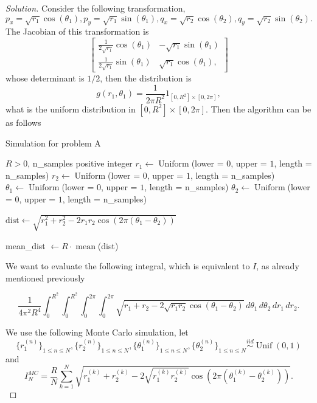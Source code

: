 \documentclass[a4paper,10pt, notitlepage]{report}
\begin{document}
\begin{enumerate}
\begin{proof}[Solution]

 Consider the following transformation, 
 $$
 p_x = \sqrt{r_1}\cos(\theta_1), p_y = \sqrt{r_1}\sin(\theta_1), q_x = \sqrt{r_2}\cos(\theta_2), q_y = \sqrt{r_2}\sin(\theta_2).
 $$
 The Jacobian of this transformation is 
 $$
 \begin{bmatrix}
    \frac{1}{2\sqrt{r_1}}\cos(\theta_1) & -\sqrt{r_1}\sin(\theta_1) \\
    \frac{1}{2\sqrt{r_1}}\sin(\theta_1) & \sqrt{r_1}\cos(\theta_1),
\end{bmatrix}
 $$
 whose determinant is $1/2$, then the distribution is 
 $$
 g(r_1, \theta_1) = \frac{1}{2\pi R^2}1_{[0,R^2] \times [0,2\pi]}, 
 $$
 what is the uniform distribution in $[0,R^2] \times [0,2\pi]$. Then the
 algorithm can be as follows

 \begin{algorithm}
    \caption{Simulation for problem A}\label{alg:problem-A}
    \begin{algorithmic}
    \Require $R > 0$, n\_samples positive integer
    \State $r_1 \gets \operatorname{Uniform}$(lower = 0, upper = $1$, length = n\_samples)
    \State $r_2 \gets \operatorname{Uniform}$(lower = 0, upper = $1$, length = n\_samples)
    \State $\theta_1 \gets \operatorname{Uniform}$(lower = 0, upper = $1$,
    length = n\_samples)
    \State $\theta_2 \gets \operatorname{Uniform}$(lower = 0, upper = $1$,
    length = n\_samples)
    
    \State $\text{dist} \gets \sqrt{r_1^2 + r_2^2 - 2r_1r_2\cos(2\pi(\theta_1 -
    \theta_2))}$ 

    \State mean\_dist $\gets R\cdot \operatorname{mean}$(dist)

    \end{algorithmic}
\end{algorithm}

We want to evaluate the following integral, which is equivalent to $I$, as
already mentioned previously

$$
\frac{1}{4\pi^2 R^4}\int_{0}^{R^2}\int_{0}^{R^2}\int_{0}^{2\pi}\int_{0}^{2\pi}\sqrt{r_1 + r_2 - 2\sqrt{r_1r_2}\cos(\theta_1 -\theta_2)}\,d\theta_1\,d\theta_2\,dr_1\,dr_2.
$$

We use the following Monte Carlo simulation, let 
$$
\{r_1^{(n)}\}_{1 \le n \le N}, \{r_2^{(n)}\}_{1 \le n \le N}
, \{\theta_1^{(n)}\}_{1 \le n \le N}
, \{\theta_2^{(n)}\}_{1 \le n \le N} \overset{iid}{\sim} \operatorname{Unif}(0,1)
$$
and 
$$
I^{MC}_N = \frac{R}{N}\sum_{k=1}^N \sqrt{r_1^{(k)} + r_2^{(k)} - 2\sqrt{r_1^{(k)}r_2^{(k)}} \cos(2\pi(\theta_1^{(k)} -\theta_2^{(k)}))}.
$$


\end{proof}
\end{enumerate}
\end{document}
